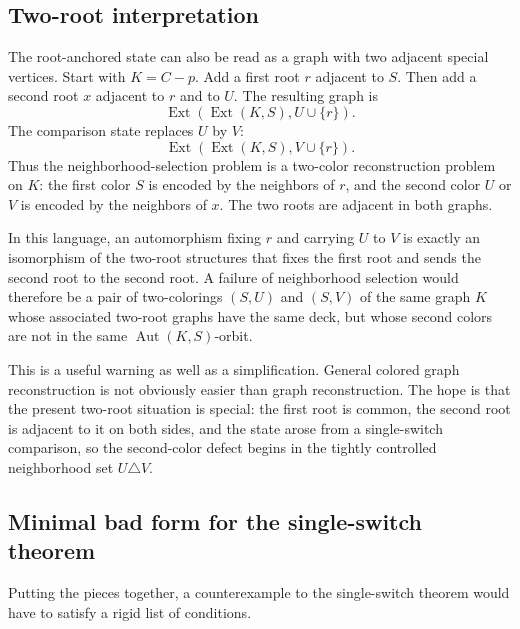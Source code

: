 \documentclass[11pt]{article}
\newcommand{\Ext}{\operatorname{Ext}}
\newcommand{\Aut}{\operatorname{Aut}}
\begin{document}
\subsection{Two-root interpretation}

The root-anchored state can also be read as a graph with two adjacent special
vertices.  Start with \(K=C-p\).  Add a first root \(r\) adjacent to \(S\).
Then add a second root \(x\) adjacent to \(r\) and to \(U\).  The resulting
graph is
\[
  \Ext(\Ext(K,S),U\cup\{r\}).
\]
The comparison state replaces \(U\) by \(V\):
\[
  \Ext(\Ext(K,S),V\cup\{r\}).
\]
Thus the neighborhood-selection problem is a two-color reconstruction
problem on \(K\): the first color \(S\) is encoded by the neighbors of \(r\),
and the second color \(U\) or \(V\) is encoded by the neighbors of \(x\).  The
two roots are adjacent in both graphs.

In this language, an automorphism fixing \(r\) and carrying \(U\) to \(V\) is
exactly an isomorphism of the two-root structures that fixes the first root
and sends the second root to the second root.  A failure of neighborhood
selection would therefore be a pair of two-colorings \((S,U)\) and \((S,V)\)
of the same graph \(K\) whose associated two-root graphs have the same deck,
but whose second colors are not in the same \(\Aut(K,S)\)-orbit.

This is a useful warning as well as a simplification.  General colored graph
reconstruction is not obviously easier than graph reconstruction.  The hope
is that the present two-root situation is special: the first root is common,
the second root is adjacent to it on both sides, and the state arose from a
single-switch comparison, so the second-color defect begins in the tightly
controlled neighborhood set \(U\triangle V\).

\subsection{Minimal bad form for the single-switch theorem}

Putting the pieces together, a counterexample to the single-switch theorem
would have to satisfy a rigid list of conditions.
\end{document}
